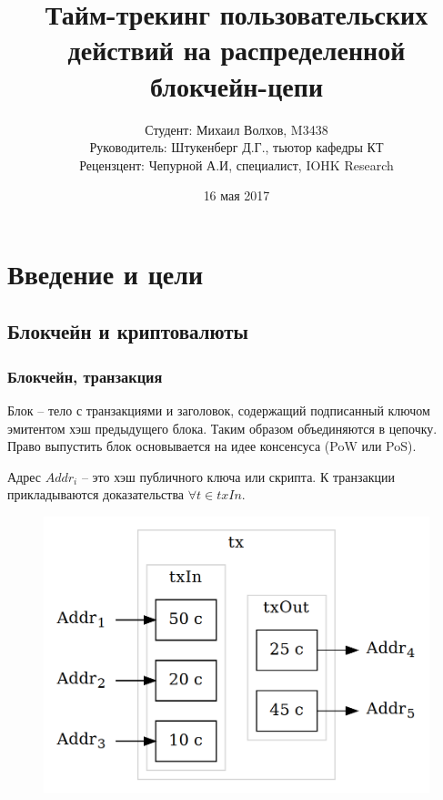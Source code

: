 \documentclass[11pt,handout,pdf,hyperref={unicode}]{beamer}
\title[Тайм-трекинг на блокчейне]{Тайм-трекинг пользовательских действий на распределенной блокчейн-цепи}
\begin{document}
\author[Михаил Волхов, M3438]{
  Студент: Михаил Волхов, M3438\\
  Руководитель: Штукенберг Д.Г., тьютор кафедры КТ \\
  Рецензцент: Чепурной А.И, специалист, IOHK Research
}
\date{16 мая 2017}

\frame{\titlepage}

\section{Введение и цели}

\subsection{Блокчейн и криптовалюты}

\begin{frame}
  \frametitle{Блокчейн, транзакция}

  Блок -- тело с транзакциями и заголовок, содержащий подписанный ключом
  эмитентом хэш предыдущего блока. Таким образом объединяются в цепочку. Право
  выпустить блок основывается на идее консенсуса (PoW или PoS).

  Адрес $Addr_i$ -- это хэш публичного ключа или скрипта. К
  транзакции прикладываются доказательства $\forall t \in txIn$.

  \begin{figure}[t]
  \includegraphics[scale=0.18]{tx_example}
  \centering
  \end{figure}

\end{frame}
\end{document}
